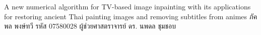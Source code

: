 \thispagestyle{empty}
{A new numerical algorithm for TV-based image inpainting with its applications for restoring ancient Thai painting images and removing subtitles from animes}
{ภัคพล  พงษ์ทวี รหัส 07580028}
{ผู้ช่วยศาสตราจารย์ ดร. นพดล  ชุมชอบ}



\clearpage

